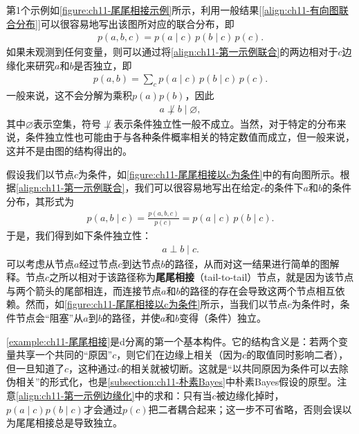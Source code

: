 \documentclass[../../main.tex]{subfiles}
\begin{document}
\begin{example}[ 尾尾相接]\label{example:ch11-尾尾相接}
第1个示例如\cref{figure:ch11-尾尾相接示例}所示，利用一般结果[\eqref{align:ch11-有向图联合分布}]可以很容易地写出该图所对应的联合分布，即
\begin{align}
  p(a,b,c) = p(a\mid c)\,p(b\mid c)\,p(c).
  \label{align:ch11-第一示例联合}
\end{align}
如果未观测到任何变量，则可以通过将\eqref{align:ch11-第一示例联合}的两边相对于$c$边缘化来研究$a$和$b$是否独立，即
\begin{align}
  p(a,b) = \sum_{c}p(a\mid c)\,p(b\mid c)\,p(c).
  \label{align:ch11-第一示例边缘化}
\end{align}
一般来说，这不会分解为乘积$p(a)p(b)$，因此
\begin{align}
  a \not\perp b \mid \varnothing,
  \label{align:ch11-第一示例非独立}
\end{align}
其中$\varnothing$表示空集，符号$\not\perp$表示条件独立性一般不成立。当然，对于特定的分布来说，条件独立性也可能由于与各种条件概率相关的特定数值而成立，但一般来说，这并不是由图的结构得出的。

假设我们以节点$c$为条件，如\cref{figure:ch11-尾尾相接以c为条件}中的有向图所示。根据\eqref{align:ch11-第一示例联合}，我们可以很容易地写出在给定$c$的条件下$a$和$b$的条件分布，其形式为
\begin{align}
  p(a,b\mid c) = \frac{p(a,b,c)}{p(c)} = p(a\mid c)\,p(b\mid c).
\end{align}
于是，我们得到如下条件独立性：
\begin{align}
  a \perp b \mid c.
\end{align}
可以考虑从节点$a$经过节点$c$到达节点$b$的路径，从而对这一结果进行简单的图解释。节点$c$之所以相对于该路径称为\textbf{尾尾相接}（tail-to-tail）节点，就是因为该节点与两个箭头的尾部相连，而连接节点$a$和$b$的路径的存在会导致这两个节点相互依赖。然而，如\cref{figure:ch11-尾尾相接以c为条件}所示，当我们以节点$c$为条件时，条件节点会“阻塞”从$a$到$b$的路径，并使$a$和$b$变得（条件）独立。
\end{example}

\begin{remark}\cref{example:ch11-尾尾相接}是d分离的第一个基本构件。它的结构含义是：若两个变量共享一个共同的“原因”$c$，则它们在边缘上相关（因为$c$的取值同时影响二者），但一旦知道了$c$，这种通过$c$的相关就被切断。这就是“以共同原因为条件可以去除伪相关”的形式化，也是\cref{subsection:ch11-朴素Bayes}中朴素Bayes假设的原型。注意\eqref{align:ch11-第一示例边缘化}中的求和：只有当$c$被边缘化掉时，$p(a\mid c)p(b\mid c)$才会通过$p(c)$把二者耦合起来；这一步不可省略，否则会误以为尾尾相接总是导致独立。
\end{remark}
\end{document}
